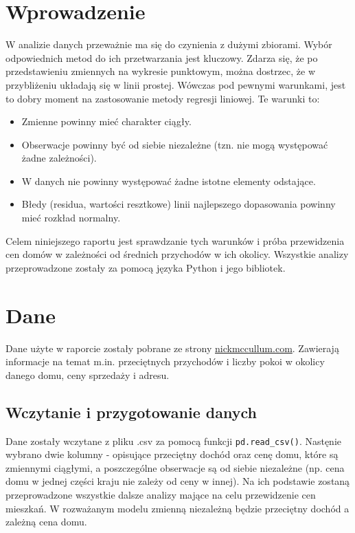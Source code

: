 \documentclass{article}
\begin{document}
\section{Wprowadzenie}
W analizie danych przeważnie ma się do czynienia z dużymi zbiorami. Wybór odpowiednich metod do ich przetwarzania jest kluczowy. Zdarza się, że po przedstawieniu zmiennych na wykresie punktowym, można dostrzec, że w przybliżeniu układają się w linii prostej. Wówczas pod pewnymi warunkami, jest to dobry moment na zastosowanie metody regresji liniowej. 
Te warunki to:
\begin{itemize}
    \item Zmienne powinny mieć charakter ciągły. 
    \item Obserwacje powinny być od siebie niezależne (tzn. nie mogą występować żadne zależności).
    \item W danych nie powinny występować żadne istotne elementy odstające. 
    \item Błedy (residua, wartości resztkowe) linii najlepszego dopasowania powinny mieć rozkład normalny.
    \end{itemize}
Celem niniejszego raportu jest sprawdzanie tych warunków i próba przewidzenia cen domów w zależności od średnich przychodów w ich okolicy. Wszystkie analizy przeprowadzone zostały za pomocą języka Python i jego bibliotek.
\section{Dane}
Dane użyte w raporcie zostały pobrane ze strony \href{https://bit.ly/3YOdcKU}{nickmccullum.com}. Zawierają informacje na temat m.in. przeciętnych przychodów i liczby pokoi w okolicy danego domu, ceny sprzedaży i adresu.

\subsection{Wczytanie i przygotowanie danych}
Dane zostały wczytane z pliku .csv za pomocą funkcji \texttt{pd.read\_csv()}. Nastęnie wybrano dwie kolumny - opisujące przeciętny dochód oraz cenę domu, które są zmiennymi ciągłymi, a poszczególne obserwacje są od siebie niezależne (np. cena domu w jednej części kraju nie zależy od ceny w innej). Na ich podstawie zostaną przeprowadzone wszystkie dalsze analizy mające na celu przewidzenie cen mieszkań.
W rozważanym modelu zmienną niezależną będzie przeciętny dochód a zależną cena domu. 
\end{document}
